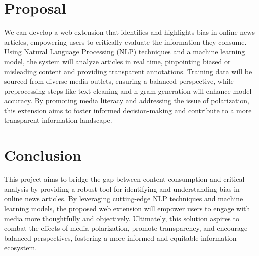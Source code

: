 \documentclass{article}
\begin{document}
\section{Proposal}
We can develop a web extension that identifies and highlights bias in online news articles, empowering users to critically evaluate the information they consume. Using  Natural Language Processing (NLP) techniques and a machine learning model, the system will analyze articles in real time, pinpointing biased or misleading content and providing transparent annotations. Training data will be sourced from diverse media outlets, ensuring a balanced perspective, while preprocessing steps like text cleaning and n-gram generation will enhance model accuracy. By promoting media literacy and addressing the issue of polarization, this extension aims to foster informed decision-making and contribute to a more transparent information landscape.

\section{Conclusion}
This project aims to bridge the gap between content consumption and critical analysis by providing a robust tool for identifying and understanding bias in online news articles. By leveraging cutting-edge NLP techniques and machine learning models, the proposed web extension will empower users to engage with media more thoughtfully and objectively. Ultimately, this solution aspires to combat the effects of media polarization, promote transparency, and encourage balanced perspectives, fostering a more informed and equitable information ecosystem.

\nocite{*}


\end{document}
